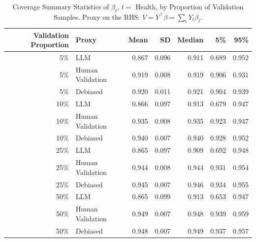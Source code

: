 \begin{table}

\caption{\label{tab:unnamed-chunk-1}Coverage Summary Statistics of $\beta_{t}$, $t=$ Health, by Proportion of Validation Samples.
      Proxy on the RHS: $V = Y^\top \beta = \sum_{t} Y_t \beta_t$.}
\centering
\begin{tabular}[t]{rlrrrrr}
\toprule
Validation Proportion & Proxy & Mean & SD & Median & 5\% & 95\%\\
\midrule
5\% & LLM & 0.867 & 0.096 & 0.911 & 0.689 & 0.952\\
5\% & Human Validation & 0.919 & 0.008 & 0.919 & 0.906 & 0.931\\
5\% & Debiased & 0.920 & 0.011 & 0.921 & 0.904 & 0.939\\
10\% & LLM & 0.866 & 0.097 & 0.913 & 0.679 & 0.947\\
10\% & Human Validation & 0.935 & 0.008 & 0.935 & 0.923 & 0.947\\
10\% & Debiased & 0.940 & 0.007 & 0.940 & 0.928 & 0.952\\
25\% & LLM & 0.865 & 0.097 & 0.909 & 0.692 & 0.948\\
25\% & Human Validation & 0.944 & 0.008 & 0.944 & 0.931 & 0.954\\
25\% & Debiased & 0.945 & 0.007 & 0.946 & 0.934 & 0.955\\
50\% & LLM & 0.865 & 0.099 & 0.913 & 0.653 & 0.947\\
50\% & Human Validation & 0.949 & 0.007 & 0.948 & 0.939 & 0.959\\
50\% & Debiased & 0.948 & 0.007 & 0.949 & 0.937 & 0.957\\
\bottomrule
\end{tabular}
\end{table}
